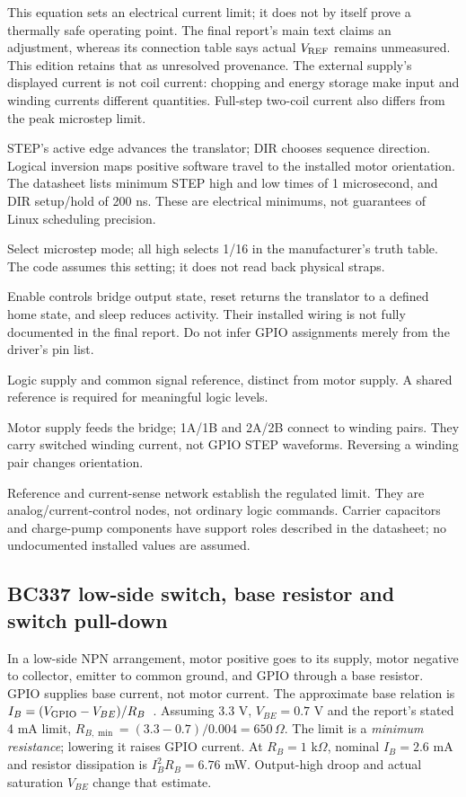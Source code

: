 This equation sets an electrical current limit; it does not by itself prove
a thermally safe operating point. The final report's main text claims an
adjustment, whereas its connection table says actual $V_{\rm REF}$ remains
unmeasured. This edition retains that as unresolved provenance. The external
supply's displayed current is not coil current: chopping and energy storage
make input and winding currents different quantities. Full-step two-coil
current also differs from the peak microstep limit.

\begin{description}[style=nextline]
\item[STEP and DIR.] STEP's active edge advances the translator; DIR chooses
sequence direction. Logical inversion maps positive software travel to the
installed motor orientation. The datasheet lists minimum STEP high and low
times of 1 microsecond, and DIR setup/hold of 200 ns. These are electrical
minimums, not guarantees of Linux scheduling precision.
\item[MS1, MS2, MS3.] Select microstep mode; all high selects 1/16 in the
manufacturer's truth table. The code assumes this setting; it does not
read back physical straps.
\item[ENABLE, RESET, SLEEP.] Enable controls bridge output state, reset returns
the translator to a defined home state, and sleep reduces activity. Their
installed wiring is not fully documented in the final report. Do not infer
GPIO assignments merely from the driver's pin list.
\item[VDD and GND.] Logic supply and common signal reference, distinct from
motor supply. A shared reference is required for meaningful logic levels.
\item[VMOT / VBB and winding outputs.] Motor supply feeds the bridge;
1A/1B and 2A/2B connect to winding pairs. They carry switched winding
current, not GPIO STEP waveforms. Reversing a winding pair changes orientation.
\item[VREF and SENSE.] Reference and current-sense network establish the
regulated limit. They are analog/current-control nodes, not ordinary
logic commands. Carrier capacitors and charge-pump components have support
roles described in the datasheet; no undocumented installed values are assumed.
\end{description}

\subsection{BC337 low-side switch, base resistor and switch pull-down}
In a low-side NPN arrangement, motor positive goes to its supply, motor
negative to collector, emitter to common ground, and GPIO through a base
resistor. GPIO supplies base current, not motor current. The approximate
base relation is $I_B=(V_{\rm GPIO}-V_{BE})/R_B$~\cite{rohmnpn}.
Assuming 3.3 V, $V_{BE}=0.7$ V and the report's stated 4 mA limit,
$R_{B,\min}=(3.3-0.7)/0.004=650\,\Omega$.
The limit is a \emph{minimum resistance}; lowering it raises GPIO current.
At $R_B=1$ k$\Omega$, nominal $I_B=2.6$ mA and resistor dissipation is
$I_B^2R_B=6.76$ mW. Output-high droop and actual saturation $V_{BE}$
change that estimate.

